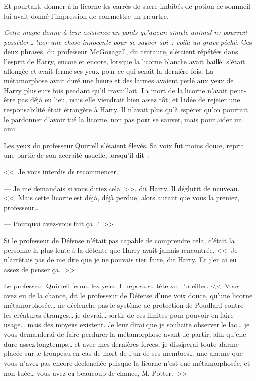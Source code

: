 Et pourtant, donner à la licorne les carrés de sucre imbibés de potion de sommeil lui avait donné l'impression de commettre un meurtre.

\emph{Cette magie donne à leur existence un poids qu'aucun simple animal ne pourrait posséder… tuer une chose innocente pour se sauver soi~: voilà un grave péché.} Ces deux phrases, du professeur McGonagall, du centaure, s'étaient répétées dans l'esprit de Harry, encore et encore, lorsque la licorne blanche avait baillé, s'était allongée et avait fermé ses yeux pour ce qui serait la dernière fois. La métamorphose avait duré une heure et des larmes avaient perlé aux yeux de Harry plusieurs fois pendant qu'il travaillait. La mort de la licorne n'avait peut-être pas déjà eu lieu, mais elle viendrait bien assez tôt, et l'idée de rejeter une responsabilité était étrangère à Harry. Il n'avait plus qu'à espérer qu'on pourrait le pardonner d'avoir tué la licorne, non pas pour se sauver, mais pour aider un ami.

Les yeux du professeur Quirrell s'étaient élevés. Sa voix fut moins douce, reprit une partie de son acerbité usuelle, lorsqu'il dit~:

<<~Je vous interdis de recommencer.

--- Je me demandais si vous diriez cela~>>, dit Harry. Il déglutit de nouveau. <<~Mais cette licorne est déjà, déjà perdue, alors autant que vous la preniez, professeur…

--- Pourquoi avez-vous fait ça~?~>>

Si le professeur de Défense n'était pas capable de comprendre cela, c'était la personne la plus lente à la détente que Harry avait jamais rencontrée. <<~Je n'arrêtais pas de me dire que je ne pouvais rien faire, dit Harry. Et j'en ai eu assez de penser ça.~>>

Le professeur Quirrell ferma les yeux. Il reposa sa tête sur l'oreiller. <<~Vous avez eu de la chance, dit le professeur de Défense d'une voix douce, qu'une licorne métamorphosée… ne déclenche pas le système de protection de Poudlard contre les créatures étranges… je devrai… sortir de ces limites pour pouvoir en faire usage… mais des moyens existent. Je leur dirai que je souhaite observer le lac… je vous demanderai de faire perdurer la métamorphose avant de partir, afin qu'elle dure assez longtemps… et avec mes dernières forces, je dissiperai toute alarme placée sur le troupeau en cas de mort de l'un de ses membres… une alarme que vous n'avez pas encore déclenchée puisque la licorne n'est que métamorphosée, et non tuée… vous avez eu beaucoup de chance, M. Potter.~>>

